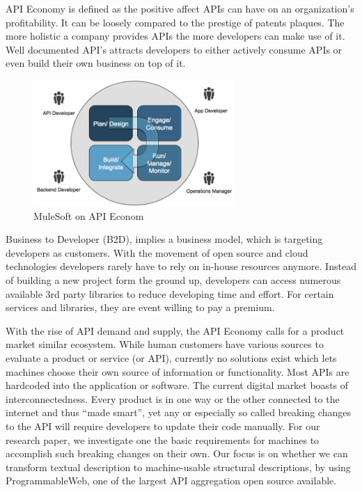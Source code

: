 \documentclass[a4paper]{IEEEtran}
\begin{document}
API Economy is defined as the positive affect APIs can have on an organization’s profitability.\cite{mulesoft}
It can be loosely compared to the prestige of patents plaques. The more holistic a company provides APIs the more developers can make use of it. Well documented API’s attracts developers to either actively consume APIs or even build their own business on top of it.

\begin{figure}[!t]
\centering
\includegraphics[width= 3in]{img/APIcycle.png}
\caption{MuleSoft on API Econom \cite{mulesoft}}
\label{fig_sim}
\end{figure}

Business to Developer (B2D), implies a business model, which is targeting developers as customers. With the movement of open source and cloud technologies developers rarely have to rely on in-house resources anymore. Instead of building a new project form the ground up, developers can access numerous available 3rd party libraries to reduce developing time and effort. For certain services and libraries, they are event willing to pay a premium.

With the rise of API demand and supply, the API Economy calls for a product market similar ecosystem. While human customers have various sources to evaluate a product or service (or API), currently no solutions exist which lets machines choose their own source of information or functionality. Most APIs are hardcoded into the application or software. The current digital market boasts of interconnectedness. Every product is in one way or the other connected to the internet and thus “made smart”, yet any or especially so called breaking changes to the API will require developers to update their code manually. 
For our research paper, we investigate one the basic requirements for machines to accomplish such breaking changes on their own. Our focus is on whether we can transform textual description to machine-usable structural descriptions, by using ProgrammableWeb, one of the largest API aggregation open source available.
\end{document}
